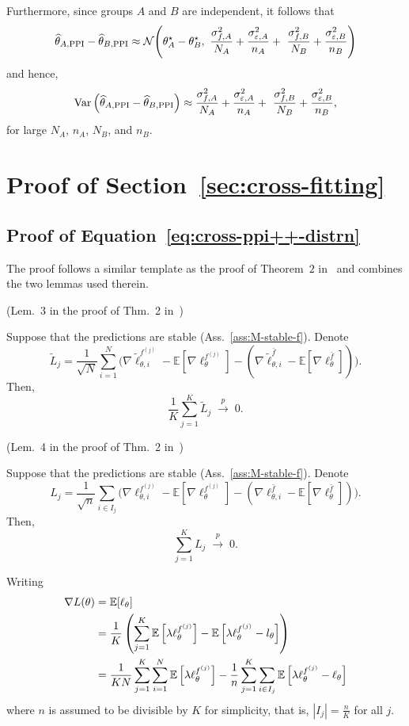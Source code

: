 \noindent
Furthermore, since groups $A$ and $B$ are independent, it follows that\[
\wh\theta_{A,\mathrm{PPI}}-\wh\theta_{B,\mathrm{PPI}} \approx \mathcal{N}\!\left(\theta_A^\star-\theta_B^\star,\ \frac{\sigma_{f,A}^2}{N_A} + \frac{\sigma_{\varepsilon,A}^2}{n_A}+\ \frac{\sigma_{f,B}^2}{N_B} + \frac{\sigma_{\varepsilon,B}^2}{n_B}\right)
\]and hence,\[
\Var\left(\wh\theta_{A,\mathrm{PPI}}-\wh\theta_{B,\mathrm{PPI}}\right)\approx
\frac{\sigma_{f,A}^2}{N_A} + \frac{\sigma_{\varepsilon,A}^2}{n_A}+\ \frac{\sigma_{f,B}^2}{N_B} + \frac{\sigma_{\varepsilon,B}^2}{n_B},
\]for large $N_A$, $n_A$, $N_B$, and $n_B$.

\section{Proof of Section~\ref{sec:cross-fitting}}
\subsection{Proof of Equation~\eqref{eq:cross-ppi++-distrn}}
The proof follows a similar template as the proof of Theorem~$2$ in~\citep{zrnic2024cross} and combines the two lemmas used therein.

\begin{lemma}\label{lem:asy-fU} (Lem.~3 in the proof of Thm.~2 in~\citep{zrnic2024cross})

\noindent
Suppose that the predictions are stable (Ass.~\ref{ass:M-stable-f}). Denote
\[\tilde{L}_j= \frac{1}{\sqrt{N}} \sum_{i=1}^N\Big(
\nabla \tilde{\ell}^{f^{(j)}}_{\theta,i}
- \mathbb{E}[\nabla \ell^{f^{(j)}}_\theta]
- (\nabla \tilde{\ell}_{\theta,i}^{\bar f}- \mathbb{E}[\nabla \ell_\theta^{\bar f}])\Big).\]
Then,
\[\frac{1}{K} \sum_{j=1}^K \tilde{L}_j \;\xrightarrow{p}\;0.\]
\end{lemma}

\begin{lemma}\label{lem:asy-fL} (Lem.~4 in the proof of Thm.~2 in~\citep{zrnic2024cross})

\noindent
Suppose that the predictions are stable (Ass.~\ref{ass:M-stable-f}). Denote
\[L_j= \frac{1}{\sqrt{n}} \sum_{i \in I_j}
\Big(\nabla \ell^{f^{(j)}}_{\theta,i}
- \mathbb{E}[\nabla \ell^{f^{(j)}}_\theta]
- (\nabla \ell_{\theta,i}^{\bar f}- \mathbb{E}[\nabla \ell_\theta^{\bar f}])\Big).\]
Then,
\[\sum_{j=1}^K L_j \;\xrightarrow{p}\; 0.\]
\end{lemma}

\noindent
Writing \begin{align*}\nabla L(\theta)&=\mathbb{E}[\ell_\theta]\\
    &=\frac{1}{K}\left(\sum^K_{j=1}\mathbb{E}\left[\lambda \ell_\theta^{f^{(j)}}\right]-\mathbb{E}\left[\lambda \ell_\theta^{f^{(j)}}-l_\theta\right]\right)\\
    &=\frac{1}{KN}\sum^K_{j=1}\sum^N_{i=1}\mathbb{E}\left[\lambda \ell_\theta^{f^{(j)}}\right]
    -\frac{1}{n}\sum^K_{j=1}\sum_{i\in I_j}\mathbb{E}\left[\lambda \ell_\theta^{f^{(j)}}-\ell_\theta\right]
    \end{align*}where $n$ is assumed to be divisible by $K$ for simplicity, that is, $|I_j|=\frac{n}{K}$ for all $j$.

